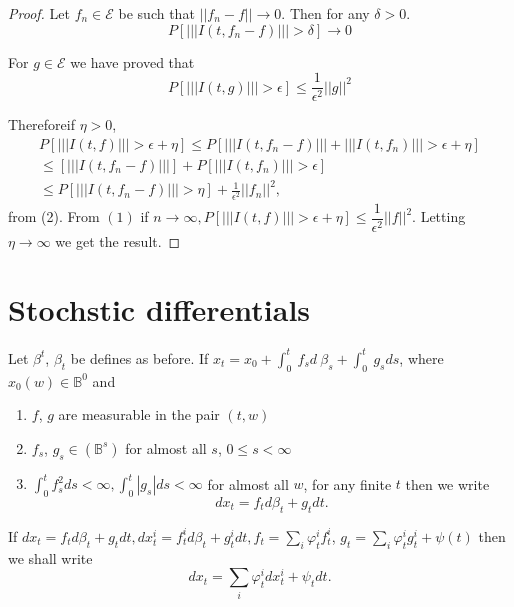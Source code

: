\begin{proof}%
Let $f_n \in \mathscr{E}$ be such that $|| f_n - f || \to 0$. Then
  for any $\delta > 0$.  
  \begin{equation*}
    P[ ||| I(t, f_n - f) ||| > \delta ] \to 0 \tag{1}
  \end{equation*}

For $g\in\mathscr{E}$ we have proved that 
\begin{equation*}
 P [ ||| I(t, g) ||| > \epsilon] \leq \frac{1}{\epsilon^2}|| g||^2 \tag{2}
\end{equation*}

Therefore\pageoriginale if $\eta > 0$, 
\begin{multline*}
    P[ ||| I(t, f) ||| > \epsilon + \eta]\leq P [ ||| I (t, f_n - f) ||| +
      ||| I (t, f_n)||| > \epsilon + \eta ] \\ 
    \leq [ ||| I(t, f_n- f)|||] + P[ ||| I (t, f_n) |||>\epsilon]\\ 
      \leq 
     P [||| I (t, f_n - f) ||| > \eta]+ \frac{1}{\epsilon^2}|| f_n ||^2,  
  \end{multline*}
  from (2). From $(1)$ if $n \to \infty , P [ ||| I (t, f) ||| > \epsilon +
    \eta] \leq \dfrac{1}{\epsilon^2} || f ||^2$. Letting $\eta \to \infty$ we
  get the result.  
\end{proof}

\section{Stochstic differentials}\label{chap5-sec5}%

Let $\beta^t$, $\beta_t$ be defines as before. If $x_t = x_0 + \int^t
_0 ~ f_s d ~ \beta _s + \int^t_0 ~ g_s ds$, where
$x_0(w)\in\mathbb{B}^0$ and   
\begin{enumerate}
\item $f$, $g$ are measurable in the pair $(t, w)$ 

\item $f_s$, $g_s \in (\mathbb{B}^s)$ for almost all $s$, $0 \leq s <
  \infty$  

\item $\int^t _0 f^2 _s ds < \infty, \int^t_0 | g_s | ds < \infty$ for
  almost all $w$, for any finite $t$ then we write  
  $$
  dx_t = f_t d \beta _t + g_t dt. 
  $$
\end{enumerate}

If $dx_t = f_t d \beta _t + g_t dt, dx^i_t = f^i_t d \beta_t + g_t^i
dt, f_t = \sum_i \varphi ^i_t f^i_t$, $g_t = \sum\limits_i \varphi^i_t
g^i_t + \psi (t)$ then we shall write  
$$
dx_t = \sum_i \varphi^i_t dx^i_t + \psi _t dt. 
$$

